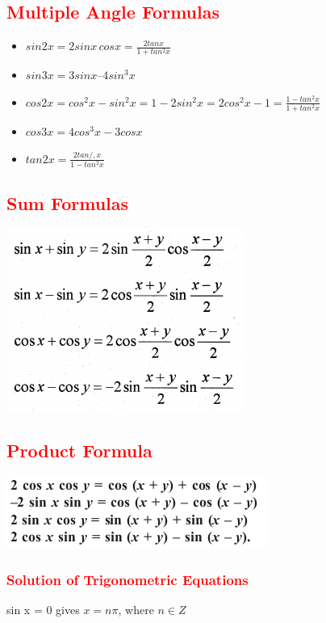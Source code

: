 \documentclass[12pt]{article}
\theoremstyle{colored}
\theoremstyle{subcolored}
\begin{document}
\begin{multicols}{2}
\begin{itemize}
\end{itemize}


\subsection*{\large \textcolor{red}{ Multiple Angle Formulas}}
\begin{itemize}
    \item $sin 2x=2 sinx \, cosx=\frac{2tanx}{1+ tan^2 x}$
    \item $sin 3x = 3 sin x – 4 sin^3 x$
    \item $cos 2x =cos^2 x - sin^2 x =1- 2sin^2x=2cos^2x-1=\frac{1-tan^2 x}{1+ tan^2 x}$
    \item  $cos 3x=4 cos^3 x -3 cos x$
    \item $tan 2x =\frac{2 tan /,x }{1- tan^2x}$
    
\end{itemize}

\subsection*{\large \textcolor{red}{Sum Formulas}}

\includegraphics[scale=0.6]{13.png}

\subsection*{\large \textcolor{red}{ Product Formula}}

\includegraphics[scale=0.6]{14.png}

\subsubsection*{\large \textcolor{red}{ Solution of Trigonometric Equations}}
sin x = 0 gives $x = n \pi$, where $n \in Z$


\end{multicols}
\end{document}
